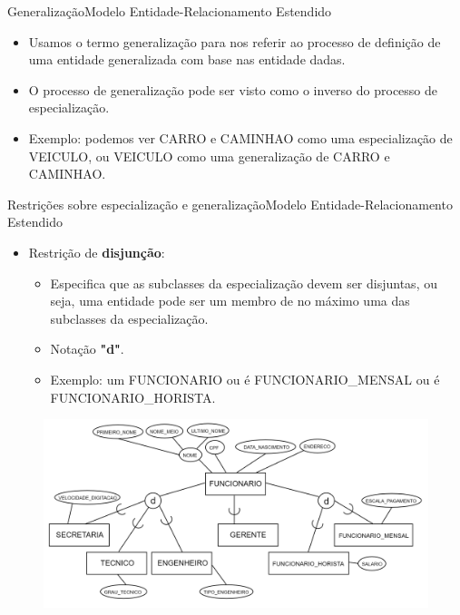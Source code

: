\documentclass[t]{beamer}
\begin{document}
\begin{ftst}{Generalização}{Modelo Entidade-Relacionamento Estendido}
\begin{itemize}
    \item Usamos o termo generalização para nos referir ao processo de definição de uma entidade generalizada com base nas entidade dadas.
    \item O processo de generalização pode ser visto como o inverso do processo de especialização.
    \item Exemplo: podemos ver CARRO e CAMINHAO como uma especialização de VEICULO, ou VEICULO como uma generalização de CARRO e CAMINHAO.
\end{itemize}
\end{ftst}


\begin{ftst}{Restrições sobre especialização e generalização}{Modelo Entidade-Relacionamento Estendido}
\small
\begin{itemize}
    \item Restrição de \textbf{disjunção}:
    \begin{itemize}
        \item Especifica que as subclasses da especialização devem ser disjuntas, ou seja, uma entidade pode ser um
membro de no máximo uma das subclasses da especialização.
        \item Notação \textbf{"d"}.
        \item Exemplo: um FUNCIONARIO ou é FUNCIONARIO\_MENSAL ou é FUNCIONARIO\_HORISTA.
    \end{itemize}
\end{itemize}
\begin{figure}
    \centering
    \includegraphics[scale=0.10]{Figuras/02_1.png}
\end{figure}

\end{ftst}
\end{document}
